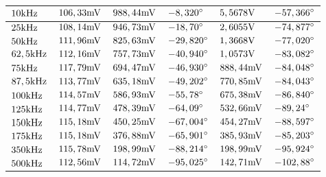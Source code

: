 \begin{table}[H]
\begin{tabular}{ll|l|l|l|l|}
\multicolumn{1}{|l|}{$10\text{kHz}     $}                & $ 106,33\text{mV} $  & $ 988,44\text{mV}  $ & $ -8,320^\circ  $ & $ 5,5678\text{V}      $ & $ -57,366^\circ  $ \\ \hline
\multicolumn{1}{|l|}{$25\text{kHz}     $}                & $ 108,14\text{mV} $  & $ 946,73\text{mV}  $ & $ -18,70^\circ  $ & $ 2,6055\text{V}      $ & $ -74,877^\circ  $ \\ \hline
\multicolumn{1}{|l|}{$50\text{kHz}     $}                & $ 111,96\text{mV} $  & $ 825,63\text{mV}  $ & $ -29,820^\circ $ & $ 1,3668\text{V}      $ & $ -77,020^\circ  $ \\ \hline
\multicolumn{1}{|l|}{$62,5\text{kHz}   $}                & $ 112,16\text{mV} $  & $ 757,73\text{mV}  $ & $ -40,940^\circ $ & $ 1,0573\text{V}      $ & $ -83,082^\circ  $ \\ \hline
\multicolumn{1}{|l|}{$75\text{kHz}     $}                & $ 117,79\text{mV} $  & $ 694,47\text{mV}  $ & $ -46,930^\circ $ & $ 888,44\text{mV}   $   & $ -84,048^\circ  $ \\ \hline
\multicolumn{1}{|l|}{$87,5\text{kHz}   $}                & $ 113,77\text{mV} $  & $ 635,18\text{mV}  $ & $ -49,202^\circ $ & $ 770,85\text{mV}   $   & $ -84,043^\circ  $ \\ \hline
\multicolumn{1}{|l|}{$100\text{kHz}    $}                & $ 114,57\text{mV} $  & $ 586,93\text{mV}  $ & $ -55,78^\circ  $ & $ 675,38\text{mV}   $   & $ -86,840^\circ  $ \\ \hline
\multicolumn{1}{|l|}{$125\text{kHz}    $}                & $ 114,77\text{mV} $  & $ 478,39\text{mV}  $ & $ -64,09^\circ  $ & $ 532,66\text{mV}   $   & $ -89,24^\circ   $ \\ \hline
\multicolumn{1}{|l|}{$150\text{kHz}    $}                & $ 115,18\text{mV} $  & $ 450,25\text{mV}  $ & $ -67,004^\circ $ & $ 454,27\text{mV}   $   & $ -88,597^\circ  $ \\ \hline
\multicolumn{1}{|l|}{$175\text{kHz}    $}                & $ 115,18\text{mV} $  & $ 376,88\text{mV}  $ & $ -65,901^\circ $ & $ 385,93\text{mV}   $   & $ -85,203^\circ  $ \\ \hline
\multicolumn{1}{|l|}{$350\text{kHz}    $}                & $ 115,78\text{mV} $  & $ 198,99\text{mV}  $ & $ -88,214^\circ $ & $ 198,99\text{mV}   $   & $ -95,924^\circ  $ \\ \hline
\multicolumn{1}{|l|}{$500\text{kHz}    $}                & $ 112,56\text{mV} $  & $ 114,72\text{mV}  $ & $ -95,025^\circ $ & $ 142,71\text{mV}   $   & $ -102,88^\circ  $ \\ \hline
\end{tabular}
\end{table}